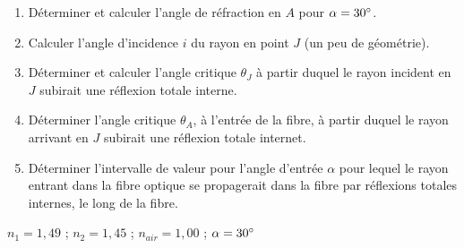 \documentclass[11pt,a4paper]{article}
\begin{document}
\begin{enumerate}
    \item Déterminer et calculer l'angle de réfraction en $A$ pour $\alpha = 30\degree$. 
    \item Calculer l'angle d'incidence $i$ du rayon en point $J$ (un peu de géométrie). 
    \item Déterminer et calculer l'angle critique $\theta_J$ à partir duquel le rayon incident en $J$ subirait une réflexion totale interne. 
    \item Déterminer l'angle critique $\theta_A$, à l'entrée de la fibre, à partir duquel le rayon arrivant en $J$ subirait une réflexion totale internet. 
    \item Déterminer l'intervalle de valeur pour l'angle d'entrée $\alpha$ pour lequel le rayon entrant dans la fibre optique se propagerait dans la fibre par réflexions totales internes, le long de la fibre. 
\end{enumerate}

\begin{tcolorbox}[title=Données]
$n_1=1,49$ \quad ; \quad $n_2=1,45$ \quad ; \quad $n_{air}=1,00$ \quad ; \quad $\alpha=30\degree$  
\end{tcolorbox}

\vspace{1cm}
\end{document}
